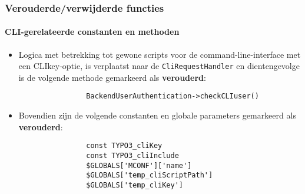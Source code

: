 \begin{frame}[fragile]
	\frametitle{Verouderde/verwijderde functies}
	\framesubtitle{CLI-gerelateerde constanten en methoden}


	\begin{itemize}

		\item Logica met betrekking tot gewone scripts voor de command-line-interface met een CLIkey-optie, 
			is verplaatst naar de \texttt{CliRequestHandler} en dientengevolge is de volgende methode 
			gemarkeerd als \textbf{verouderd}:

			\begin{lstlisting}
				BackendUserAuthentication->checkCLIuser()
			\end{lstlisting}

		\item Bovendien zijn de volgende constanten en globale parameters gemarkeerd als
			 \textbf{verouderd}:

			\begin{lstlisting}
				const TYPO3_cliKey
				const TYPO3_cliInclude
				$GLOBALS['MCONF']['name']
				$GLOBALS['temp_cliScriptPath']
				$GLOBALS['temp_cliKey']
			\end{lstlisting}

	\end{itemize}

\end{frame}



